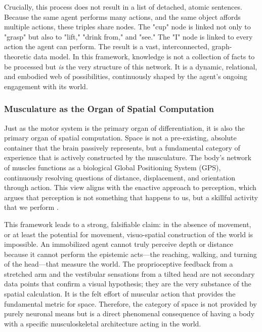 Crucially, this process does not result in a list of detached, atomic sentences. Because the same agent performs many actions, and the same object affords multiple actions, these triples share nodes. The "cup" node is linked not only to "grasp" but also to "lift," "drink from," and "see." The "I" node is linked to every action the agent can perform. The result is a vast, interconnected, graph-theoretic data model. In this framework, knowledge is not a collection of facts to be processed but \textit{is} the very structure of this network. It is a dynamic, relational, and embodied web of possibilities, continuously shaped by the agent's ongoing engagement with its world.

\subsubsection{Musculature as the Organ of Spatial Computation}
\label{ssubsec:muscles_space}
Just as the motor system is the primary organ of differentiation, it is also the primary organ of spatial computation. Space is not a pre-existing, absolute container that the brain passively represents, but a fundamental category of experience that is actively constructed by the musculature. The body's network of muscles functions as a biological Global Positioning System (GPS), continuously resolving questions of distance, displacement, and orientation through action. This view aligns with the enactive approach to perception, which argues that perception is not something that happens to us, but a skillful activity that we perform \cite{noe_action_2004}.

This framework leads to a strong, falsifiable claim: in the absence of movement, or at least the potential for movement, visuo-spatial construction of the world is impossible. An immobilized agent cannot truly perceive depth or distance because it cannot perform the epistemic acts—the reaching, walking, and turning of the head—that measure the world. The proprioceptive feedback from a stretched arm and the vestibular sensations from a tilted head are not secondary data points that confirm a visual hypothesis; they are the very substance of the spatial calculation. It is the felt effort of muscular action that provides the fundamental metric for space. Therefore, the category of space is not provided by purely neuronal means but is a direct phenomenal consequence of having a body with a specific musculoskeletal architecture acting in the world.

